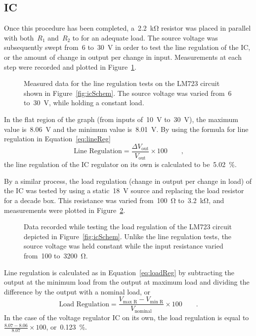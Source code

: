 \subsection{IC}
Once this procedure has been completed, a~\SI{2.2}{\kilo\ohm} resistor was
placed in parallel with both~$R_1$ and~$R_2$ to for an adequate load.  The
source voltage was subsequently swept from~6 to~\SI{30}{\volt} in order to test
the line regulation of the IC, or the amount of change in output per change in
input.  Measurements at each step were recorded and plotted in
Figure~\ref{fig:vrLineReg}.
%
\begin{figure}[H]
	\centering
	
	\parbox{4.25in}{
	\caption[Plot --- Line regulation of LM723]{Measured data for the line
	regulation tests on the LM723 circuit shown in Figure~\ref{fig:icSchem}.  The
	source voltage was varied from~6 to~\SI{30}{\volt}, while holding a constant
	load.}
	\label{fig:vrLineReg}
	}
\end{figure}
%
In the flat region of the graph (from inputs of~\SI{10}{\volt}
to~\SI{30}{\volt}), the maximum value is~\SI{8.06}{\volt} and the minimum value
is~\SI{8.01}{\volt}.  By using the formula for line regulation in
Equation~\eqref{eq:lineReg}
%
\begin{equation}
	\text{Line Regulation} = \frac{\Delta V_\text{out}}{V_\text{out}} \times 100 \qquad \text{,}
	\label{eq:lineReg}
\end{equation}
%
the line regulation of the IC regulator on its own is calculated to
be~\SI{5.02}{\percent}.

By a similar process, the load regulation (change in output per change in load)
of the IC was tested by using a static~\SI{18}{\volt} source and replacing the
load resistor for a decade box.  This resistance was varied from~\SI{100}{\ohm}
to~\SI{3.2}{\kilo\ohm}, and measurements were plotted in
Figure~\ref{fig:vrLoadReg}.
%
\begin{figure}[H]
	\centering
	
	\parbox{4.25in}{
	\caption[Plot -- Load regulation of LM723]{Data recorded while testing the
	load regulation of the LM723 circuit depicted in Figure~\ref{fig:icSchem}.
	Unlike the line regulation tests, the source voltage was held constant
	while the input resistance varied from~100 to~\SI{3200}{\ohm}.}
	\label{fig:vrLoadReg}
	}
\end{figure}
%
Line regulation is calculated as in Equation~\eqref{eq:loadReg} by subtracting
the output at the minimum load from the output at maximum load and dividing the
difference by the output with a nominal load, or
%
\begin{equation}
	\text{Load Regulation} = \frac{V_\text{max R} - V_\text{min R}}{V_\text{nominal}} \times 100 \qquad \text{.}
	\label{eq:loadReg}
\end{equation}
%
In the case of the voltage regulator IC on its own, the load regulation is
equal to~$\frac{8.07-8.06}{8.07} \times 100$, or~\SI{0.123}{\percent}.


\begin{figure}[H]
	\centering
	
	\caption{}
	\label{fig:fullLoadReg}
\end{figure}
